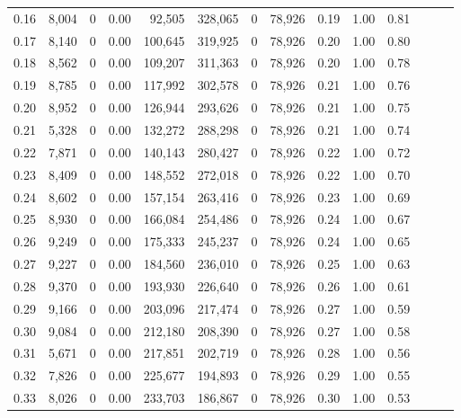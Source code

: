 \begin{tabular}{rrrrrrrrrrrrrr}
0.16 &   8,004 &      0 &  0.00 &   92,505 &  328,065 &       0 &  78,926 &  0.19 &  1.00 &      0.81 \\
0.17 &   8,140 &      0 &  0.00 &  100,645 &  319,925 &       0 &  78,926 &  0.20 &  1.00 &      0.80 \\
0.18 &   8,562 &      0 &  0.00 &  109,207 &  311,363 &       0 &  78,926 &  0.20 &  1.00 &      0.78 \\
0.19 &   8,785 &      0 &  0.00 &  117,992 &  302,578 &       0 &  78,926 &  0.21 &  1.00 &      0.76 \\
0.20 &   8,952 &      0 &  0.00 &  126,944 &  293,626 &       0 &  78,926 &  0.21 &  1.00 &      0.75 \\
0.21 &   5,328 &      0 &  0.00 &  132,272 &  288,298 &       0 &  78,926 &  0.21 &  1.00 &      0.74 \\
0.22 &   7,871 &      0 &  0.00 &  140,143 &  280,427 &       0 &  78,926 &  0.22 &  1.00 &      0.72 \\
0.23 &   8,409 &      0 &  0.00 &  148,552 &  272,018 &       0 &  78,926 &  0.22 &  1.00 &      0.70 \\
0.24 &   8,602 &      0 &  0.00 &  157,154 &  263,416 &       0 &  78,926 &  0.23 &  1.00 &      0.69 \\
0.25 &   8,930 &      0 &  0.00 &  166,084 &  254,486 &       0 &  78,926 &  0.24 &  1.00 &      0.67 \\
0.26 &   9,249 &      0 &  0.00 &  175,333 &  245,237 &       0 &  78,926 &  0.24 &  1.00 &      0.65 \\
0.27 &   9,227 &      0 &  0.00 &  184,560 &  236,010 &       0 &  78,926 &  0.25 &  1.00 &      0.63 \\
0.28 &   9,370 &      0 &  0.00 &  193,930 &  226,640 &       0 &  78,926 &  0.26 &  1.00 &      0.61 \\
0.29 &   9,166 &      0 &  0.00 &  203,096 &  217,474 &       0 &  78,926 &  0.27 &  1.00 &      0.59 \\
0.30 &   9,084 &      0 &  0.00 &  212,180 &  208,390 &       0 &  78,926 &  0.27 &  1.00 &      0.58 \\
0.31 &   5,671 &      0 &  0.00 &  217,851 &  202,719 &       0 &  78,926 &  0.28 &  1.00 &      0.56 \\
0.32 &   7,826 &      0 &  0.00 &  225,677 &  194,893 &       0 &  78,926 &  0.29 &  1.00 &      0.55 \\
0.33 &   8,026 &      0 &  0.00 &  233,703 &  186,867 &       0 &  78,926 &  0.30 &  1.00 &      0.53 \\

\end{tabular}
